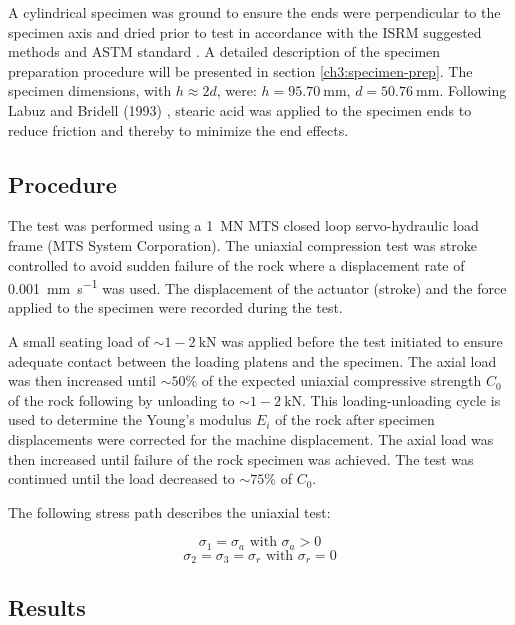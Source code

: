 A cylindrical specimen was ground to ensure the ends were perpendicular to the specimen axis and dried prior to test in accordance with the ISRM suggested methods \cite{ISRM2015} and ASTM standard \cite{ASTM2019}. A detailed description of the specimen preparation procedure will be presented in section \ref{ch3:specimen-prep}. The specimen dimensions, with $h\approx 2d$, were: $h = \SI{95.70}{\milli\meter}$, $d = \SI{50.76}{\milli\meter}$. Following Labuz and Bridell (1993) \cite{Labuz1993}, stearic acid was applied to the specimen ends to reduce friction and thereby to minimize the end effects.

\subsection{Procedure}

The test was performed using a \SI{1}{\mega\newton} MTS closed loop servo-hydraulic load frame (MTS System Corporation). The uniaxial compression test was stroke controlled to avoid sudden failure of the rock where a displacement rate of \SI{0.001}{\milli\meter\per\second} was used. The displacement of the actuator (stroke) and the force applied to the specimen were recorded during the test.

A small seating load of $\sim 1-\SI{2}{\kilo\newton}$ was applied before the test initiated to ensure adequate contact between the loading platens and the specimen. The axial load was then increased until $\sim 50\%$ of the expected uniaxial compressive strength $C_0$ of the rock following by unloading to $\sim 1-\SI{2}{\kilo\newton}$. This loading-unloading cycle is used to determine the Young’s modulus $E_i$ of the rock after specimen displacements were corrected for the machine displacement. The axial load was then increased until failure of the rock specimen was achieved. The test was continued until the load decreased to $\sim 75\%$ of $C_0$. 

The following stress path describes the uniaxial test: 

\begin{equation}
    \sigma_1 = \sigma_a \text{ with } \sigma_a > 0
\end{equation}
\begin{equation}
    \sigma_2 = \sigma_3 = \sigma_r   \text{ with } \sigma_r = 0
\end{equation}
    

\subsection{Results}

